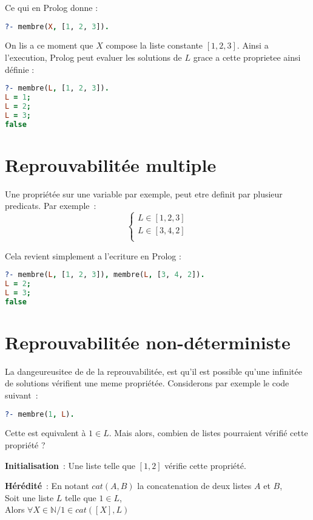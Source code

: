  Ce qui en Prolog donne :
\begin{lstlisting}[language=Prolog]
?- membre(X, [1, 2, 3]).
\end{lstlisting}

On lis a ce moment que $X$ compose la liste constante $[1, 2, 3]$. Ainsi a
l'execution, Prolog peut evaluer les solutions de $L$ grace a cette proprietee
ainsi définie :

\begin{lstlisting}[language=Prolog]
?- membre(L, [1, 2, 3]).
L = 1;
L = 2;
L = 3;
false
\end{lstlisting}


\section{Reprouvabilitée multiple}

Une propriétée sur une variable par exemple, peut etre definit par plusieur
predicats. Par exemple~:
\[
    \left\{  
    \begin{array}{c}
        L \in [1, 2, 3]\\
        L \in [3, 4, 2]\\
    \end{array}
    \right .
\]

Cela revient simplement a l'ecriture en Prolog :
\begin{lstlisting}[language=Prolog]
?- membre(L, [1, 2, 3]), membre(L, [3, 4, 2]).
L = 2;
L = 3;
false
\end{lstlisting}


\section{Reprouvabilitée non-déterministe}

La dangeureusitee de de la reprouvabilitée, est qu'il est possible qu'une
infinitée de solutions vérifient une meme propriétée. Considerons par exemple
le code suivant~:

\begin{lstlisting}[language=Prolog]
?- membre(1, L).
\end{lstlisting}

Cette est equivalent à $1 \in L$. Mais alors, combien de listes
pourraient vérifié cette propriété ?

\textbf{Initialisation}~: Une liste telle que $[1, 2]$ vérifie cette propriété.

\textbf{Hérédité}~: En notant $cat(A, B)$ la concatenation de deux listes $A$ et
$B$,\\
Soit une liste $L$ telle que $1 \in L$,\\
Alors $\forall X \in \mathbb{N} / 1 \in cat([X], L)$

